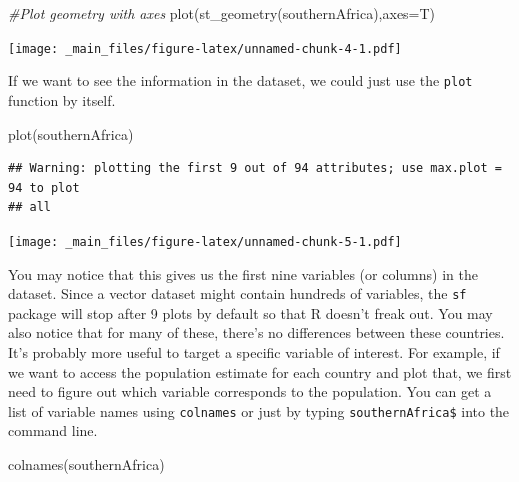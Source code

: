 \documentclass[
]{book}
\newenvironment{Shaded}{\begin{snugshade}}{\end{snugshade}}
\newcommand{\AttributeTok}[1]{\textcolor[rgb]{0.77,0.63,0.00}{#1}}
\newcommand{\CommentTok}[1]{\textcolor[rgb]{0.56,0.35,0.01}{\textit{#1}}}
\newcommand{\FunctionTok}[1]{\textcolor[rgb]{0.00,0.00,0.00}{#1}}
\newcommand{\NormalTok}[1]{#1}
\begin{document}
\begin{Shaded}
\begin{Highlighting}[]
\CommentTok{\#Plot geometry with axes}
\FunctionTok{plot}\NormalTok{(}\FunctionTok{st\_geometry}\NormalTok{(southernAfrica),}\AttributeTok{axes=}\NormalTok{T)}
\end{Highlighting}
\end{Shaded}

\texttt{[image: \_main\_files/figure-latex/unnamed-chunk-4-1.pdf]}

If we want to see the information in the dataset, we could just use the \texttt{plot} function by itself.

\begin{Shaded}
\begin{Highlighting}[]
\FunctionTok{plot}\NormalTok{(southernAfrica)}
\end{Highlighting}
\end{Shaded}

\begin{verbatim}
## Warning: plotting the first 9 out of 94 attributes; use max.plot = 94 to plot
## all
\end{verbatim}

\texttt{[image: \_main\_files/figure-latex/unnamed-chunk-5-1.pdf]}

You may notice that this gives us the first nine variables (or columns) in the dataset. Since a vector dataset might contain hundreds of variables, the \texttt{sf} package will stop after 9 plots by default so that R doesn't freak out.
You may also notice that for many of these, there's no differences between these countries. It's probably more useful to target a specific variable of interest. For example, if we want to access the population estimate for each country and plot that, we first need to figure out which variable corresponds to the population. You can get a list of variable names using \texttt{colnames} or just by typing \texttt{southernAfrica\$} into the command line.

\begin{Shaded}
\begin{Highlighting}[]
\FunctionTok{colnames}\NormalTok{(southernAfrica)}
\end{Highlighting}
\end{Shaded}
\end{document}
